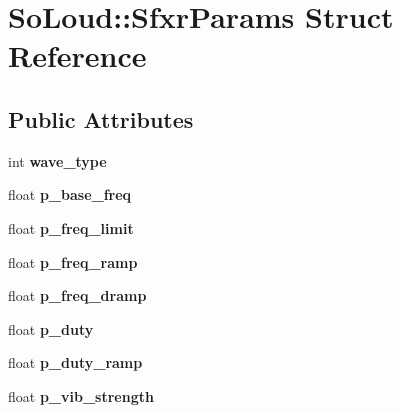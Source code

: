 \hypertarget{struct_so_loud_1_1_sfxr_params}{}\section{So\+Loud\+::Sfxr\+Params Struct Reference}
\label{struct_so_loud_1_1_sfxr_params}
\subsection*{Public Attributes}
\begin{DoxyCompactItemize}
\item 
\mbox{\label{struct_so_loud_1_1_sfxr_params_acf3b1c33376a71154c1126f2b70ac464}} 
int {\bfseries wave\+\_\+type}
\item 
\mbox{\label{struct_so_loud_1_1_sfxr_params_a8b61e1ac8b4ba33a23c96a2be75596e3}} 
float {\bfseries p\+\_\+base\+\_\+freq}
\item 
\mbox{\label{struct_so_loud_1_1_sfxr_params_aef9a3be41efac9db3a31ed71898f684f}} 
float {\bfseries p\+\_\+freq\+\_\+limit}
\item 
\mbox{\label{struct_so_loud_1_1_sfxr_params_a95bb6db72da1b4be65e7ed1510bf0b8b}} 
float {\bfseries p\+\_\+freq\+\_\+ramp}
\item 
\mbox{\label{struct_so_loud_1_1_sfxr_params_aae295ff39a61937a057df41ac1b41c8b}} 
float {\bfseries p\+\_\+freq\+\_\+dramp}
\item 
\mbox{\label{struct_so_loud_1_1_sfxr_params_a02cbcdce2fde6cdf9752ca0ad35a806f}} 
float {\bfseries p\+\_\+duty}
\item 
\mbox{\label{struct_so_loud_1_1_sfxr_params_ac0ceb5dcbdbdd6f67fe428651c655658}} 
float {\bfseries p\+\_\+duty\+\_\+ramp}
\item 
\mbox{\label{struct_so_loud_1_1_sfxr_params_af3b6dcc8d6e55d60f137b6aa59b6860e}} 
float {\bfseries p\+\_\+vib\+\_\+strength}
\item 

\end{DoxyCompactItemize}
